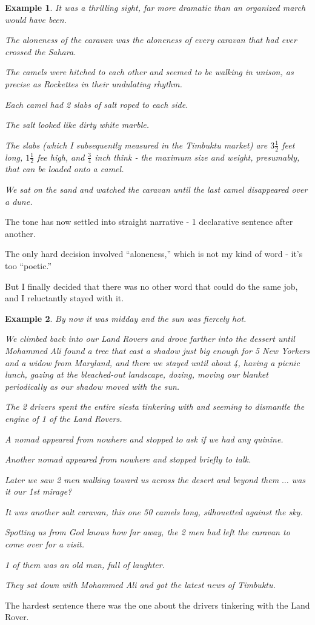 \documentclass{book}
\numberwithin{equation}{section}
\newtheorem{example}{Example}[chapter]
\begin{document}
\begin{example}
    It was a thrilling sight, far more dramatic than an organized march would have been.
    
    The aloneness of the caravan was the aloneness of every caravan that had ever crossed the Sahara.
    
    The camels were hitched to each other and seemed to be walking in unison, as precise as Rockettes in their undulating rhythm.
    
    Each camel had 2 slabs of salt roped to each side.
    
    The salt looked like dirty white marble.
    
    The slabs (which I subsequently measured in the Timbuktu market) are $3\frac{1}{2}$ feet long, $1\frac{1}{2}$ fee high, and $\frac{3}{4}$ inch think - the maximum size and weight, presumably, that can be loaded onto a camel.
    
    We sat on the sand and watched the caravan until the last camel disappeared over a dune.
\end{example}
The tone has now settled into straight narrative - 1 declarative sentence after another.

The only hard decision involved ``aloneness,'' which is not my kind of word - it's too ``poetic.''

But I finally decided that there was no other word that could do the same job, and I reluctantly stayed with it.
\begin{example}
    By now it was midday and the sun was fiercely hot.
    
    We climbed back into our Land Rovers and drove farther into the dessert until Mohammed Ali found a tree that cast a shadow just big enough for 5 New Yorkers and a widow from Maryland, and there we stayed until about 4, having a picnic lunch, gazing at the bleached-out landscape, dozing, moving our blanket periodically as our shadow moved with the sun.
    
    The 2 drivers spent the entire siesta tinkering with and seeming to dismantle the engine of 1 of the Land Rovers.
    
    A nomad appeared from nowhere and stopped to ask if we had any quinine.
    
    Another nomad appeared from nowhere and stopped briefly to talk.
    
    Later we saw 2 men walking toward us across the desert and beyond them $\ldots$ was it our 1st mirage?
    
    It was another salt caravan, this one 50 camels long, silhouetted against the sky.
    
    Spotting us from God knows how far away, the 2 men had left the caravan to come over for a visit.
    
    1 of them was an old man, full of laughter.
    
    They sat down with Mohammed Ali and got the latest news of Timbuktu.
\end{example}
The hardest sentence there was the one about the drivers tinkering with the Land Rover.
\end{document}

